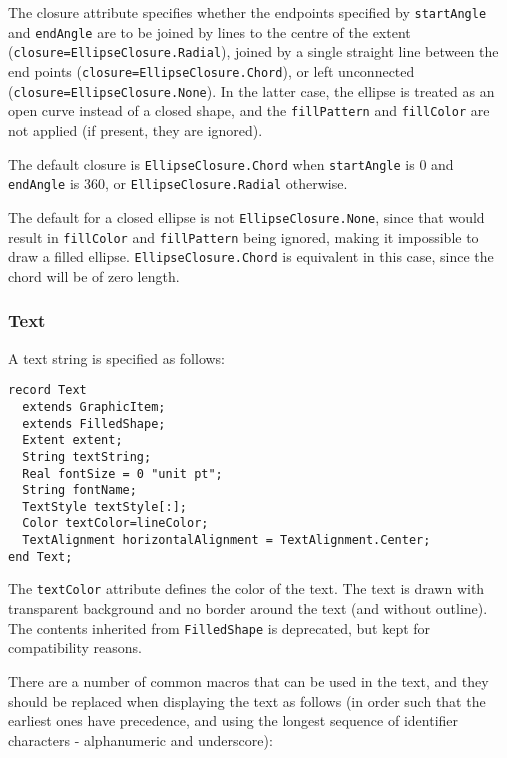 The closure attribute specifies whether the endpoints specified by
\lstinline!startAngle! and \lstinline!endAngle! are to be joined by lines to the centre of the
extent (\lstinline!closure=EllipseClosure.Radial!), joined by a single straight line
between the end points (\lstinline!closure=EllipseClosure.Chord!), or left
unconnected (\lstinline!closure=EllipseClosure.None!). In the latter case, the
ellipse is treated as an open curve instead of a closed shape, and the
\lstinline!fillPattern! and \lstinline!fillColor! are not applied (if present, they are
ignored).

The default closure is \lstinline!EllipseClosure.Chord! when \lstinline!startAngle! is 0 and
\lstinline!endAngle! is 360, or \lstinline!EllipseClosure.Radial! otherwise.

\begin{nonnormative}
The default for a closed ellipse is not \lstinline!EllipseClosure.None!, since that would result in \lstinline!fillColor!
and \lstinline!fillPattern! being ignored, making it impossible to draw a filled ellipse. \lstinline!EllipseClosure.Chord!
is equivalent in this case, since the chord will be of zero length.
\end{nonnormative}

\subsubsection{Text}\label{text}

A text string is specified as follows:
\begin{lstlisting}[language=modelica]
record Text
  extends GraphicItem;
  extends FilledShape;
  Extent extent;
  String textString;
  Real fontSize = 0 "unit pt";
  String fontName;
  TextStyle textStyle[:];
  Color textColor=lineColor;
  TextAlignment horizontalAlignment = TextAlignment.Center;
end Text;
\end{lstlisting}
The \lstinline!textColor! attribute defines the color of the text. The text is drawn
with transparent background and no border around the text (and without
outline). The contents inherited from \lstinline!FilledShape! is deprecated, but kept for compatibility reasons.

There are a number of common macros that can be used in the text, and
they should be replaced when displaying the text as follows (in order such that the earliest ones have precedence,
and using the longest sequence of identifier characters - alphanumeric and underscore):

